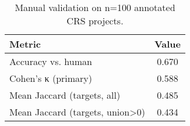 \begin{table}
\caption{Manual validation on n=100 annotated CRS projects.}
\label{tab:manual_validation}
\begin{tabular}{lc}
\toprule
Metric & Value \\
\midrule
Accuracy vs. human & 0.670 \\
Cohen’s κ (primary) & 0.588 \\
Mean Jaccard (targets, all) & 0.485 \\
Mean Jaccard (targets, union>0) & 0.434 \\
\bottomrule
\end{tabular}
\end{table}
